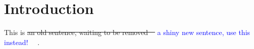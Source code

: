 \documentclass{article}
\title{\DIFdelbegin \DIFdel{David Carlisle's solution}\DIFdelend \DIFaddbegin \DIFadd{latexdiff}\DIFaddend }
\author{me\DIFaddbegin \and \DIFadd{you}\DIFaddend }
\date{May \DIFdelbegin \DIFdel{2025}\DIFdelend \DIFaddbegin \DIFadd{2024}\DIFaddend }
\providecommand{\DIFadd}[1]{{\protect\color{blue}\uwave{#1}}} %
\providecommand{\DIFdel}[1]{{\protect\color{red}\sout{#1}}}                      %
\providecommand{\DIFaddbegin}{} %
\providecommand{\DIFaddend}{} %
\providecommand{\DIFdelbegin}{} %
\providecommand{\DIFdelend}{} %
\renewcommand{\DIFadd}[1]{\textcolor{blue}{#1}}   %
\renewcommand{\DIFaddbegin}{}   %
\renewcommand{\DIFaddend}{}  %
\begin{document}
\maketitle

\section{Introduction}
This is \DIFdelbegin \DIFdel{an old sentence, waiting to be removed~\mbox{%
\cite{Hirt1974}}\hskip0pt%
}\DIFdelend \DIFaddbegin \DIFadd{a shiny new sentence, use this instead!~\mbox{%
\cite{wu2020phrasecut}}\hskip0pt%
}\DIFaddend .



\end{document}
